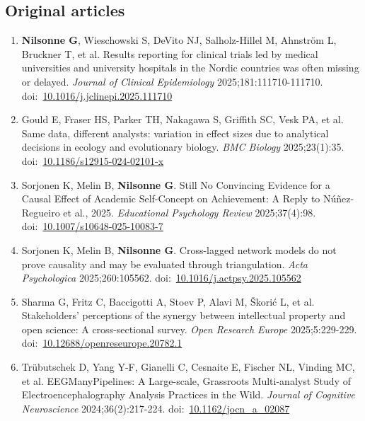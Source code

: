 \documentclass[11pt,a4paper]{article}
\begin{document}
\subsection*{Original articles}
\begin{enumerate}

\item \textbf{Nilsonne G}, Wieschowski S, DeVito NJ, Salholz-Hillel M, Ahnström L, Bruckner T, et al. Results reporting for clinical trials led by medical universities and university hospitals in the Nordic countries was often missing or delayed. \textit{Journal of Clinical Epidemiology} 2025;181:111710-111710. doi:~\href{https://doi.org/10.1016/j.jclinepi.2025.111710}{10.1016/j.jclinepi.2025.111710}

\item Gould E, Fraser HS, Parker TH, Nakagawa S, Griffith SC, Vesk PA, et al. Same data, different analysts: variation in effect sizes due to analytical decisions in ecology and evolutionary biology. \textit{BMC Biology} 2025;23(1):35. doi:~\href{https://doi.org/10.1186/s12915-024-02101-x}{10.1186/s12915-024-02101-x}

\item Sorjonen K, Melin B, \textbf{Nilsonne G}. Still No Convincing Evidence for a Causal Effect of Academic Self-Concept on Achievement: A Reply to Núñez-Regueiro et al., 2025. \textit{Educational Psychology Review} 2025;37(4):98. doi:~\href{https://doi.org/10.1007/s10648-025-10083-7}{10.1007/s10648-025-10083-7}

\item Sorjonen K, Melin B, \textbf{Nilsonne G}. Cross-lagged network models do not prove causality and may be evaluated through triangulation. \textit{Acta Psychologica} 2025;260:105562. doi:~\href{https://doi.org/10.1016/j.actpsy.2025.105562}{10.1016/j.actpsy.2025.105562}

\item Sharma G, Fritz C, Baccigotti A, Stoev P, Alavi M, Škorić L, et al. Stakeholders’ perceptions of the synergy between intellectual property and open science: A cross-sectional survey. \textit{Open Research Europe} 2025;5:229-229. doi:~\href{https://doi.org/10.12688/openreseurope.20782.1}{10.12688/openreseurope.20782.1}

\item Trübutschek D, Yang Y-F, Gianelli C, Cesnaite E, Fischer NL, Vinding MC, et al. EEGManyPipelines: A Large-scale, Grassroots Multi-analyst Study of Electroencephalography Analysis Practices in the Wild. \textit{Journal of Cognitive Neuroscience} 2024;36(2):217-224. doi:~\href{https://doi.org/10.1162/jocn_a_02087}{10.1162/jocn\_a\_02087}


\end{enumerate}
\end{document}
